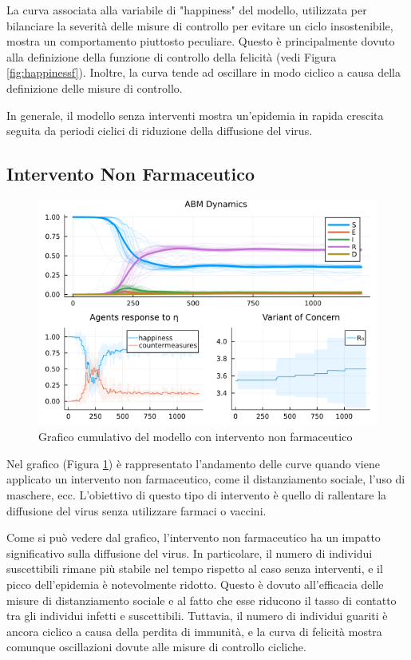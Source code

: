 La curva associata alla variabile di "happiness" del modello, 
utilizzata per bilanciare la severità delle misure di controllo 
per evitare un ciclo insostenibile, mostra un comportamento 
piuttosto peculiare. Questo è principalmente dovuto alla 
definizione della funzione di controllo della felicità 
(vedi Figura \ref{fig:happinessf}). Inoltre, la curva tende 
ad oscillare in modo ciclico a causa della definizione delle 
misure di controllo.

In generale, il modello senza interventi mostra un'epidemia in 
rapida crescita seguita da periodi ciclici di riduzione della 
diffusione del virus.

\subsection{Intervento Non Farmaceutico}

\begin{figure}[H]
    \begin{center}
		\includegraphics[width=\textwidth]{img/SocialNetworkABM_CONTROL.png}
		\caption{Grafico cumulativo del modello con intervento non farmaceutico}
		\label{fig:abm_nonpharm_intervent}
	\end{center}
\end{figure}

Nel grafico (Figura \ref{fig:abm_nonpharm_intervent}) è 
rappresentato l'andamento delle curve quando viene applicato un 
intervento non farmaceutico, come il distanziamento sociale, 
l'uso di maschere, ecc. L'obiettivo di questo tipo di intervento 
è quello di rallentare la diffusione del virus senza utilizzare 
farmaci o vaccini.

Come si può vedere dal grafico, l'intervento non farmaceutico 
ha un impatto significativo sulla diffusione del virus. 
In particolare, il numero di individui suscettibili rimane 
più stabile nel tempo rispetto al caso senza interventi, e il 
picco dell'epidemia è notevolmente ridotto. Questo è dovuto 
all'efficacia delle misure di distanziamento sociale e al fatto 
che esse riducono il tasso di contatto tra gli individui infetti 
e suscettibili. Tuttavia, il numero di individui guariti è ancora 
ciclico a causa della perdita di immunità, e la curva di felicità 
mostra comunque oscillazioni dovute alle misure di controllo cicliche.

